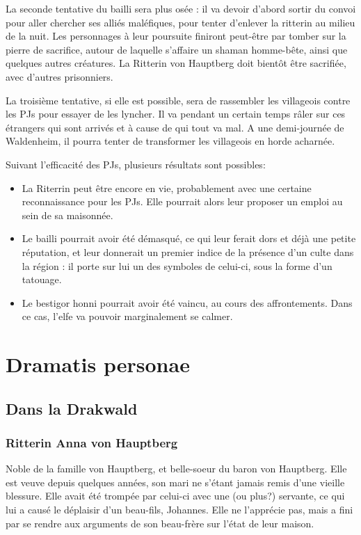 \documentclass[10pt,a4paper]{book}
\begin{document}
La seconde tentative du bailli sera plus osée : il va devoir d'abord sortir du convoi pour aller chercher ses alliés maléfiques, pour tenter d'enlever la ritterin au milieu de la nuit. Les personnages à leur poursuite finiront peut-être par tomber sur la pierre de sacrifice, autour de laquelle s'affaire un shaman homme-bête, ainsi que quelques autres créatures. La Ritterin von Hauptberg doit bientôt être sacrifiée, avec d'autres prisonniers.

La troisième tentative, si elle est possible, sera de rassembler les villageois contre les PJs pour essayer de les lyncher. Il va pendant un certain temps râler sur ces étrangers qui sont arrivés et à cause de qui tout  va mal. A une demi-journée de Waldenheim, il pourra tenter de transformer les villageois en horde acharnée.

Suivant l'efficacité des PJs, plusieurs résultats sont possibles:
\begin{itemize}
\item La Riterrin peut être encore en vie, probablement avec une certaine reconnaissance pour les PJs. Elle pourrait alors leur proposer un emploi au sein de sa maisonnée.
\item Le bailli pourrait avoir été démasqué, ce qui leur ferait dors et déjà une petite réputation, et leur donnerait un premier indice de la présence d'un culte dans la région : il porte sur lui un des symboles de celui-ci, sous la forme d'un tatouage.
\item Le bestigor honni pourrait avoir été vaincu, au cours des affrontements. Dans ce cas, l'elfe va pouvoir marginalement se calmer.
\end{itemize}
\chapter{Dramatis personae}
\section{Dans la Drakwald}
\subsection{Ritterin Anna von Hauptberg} Noble de la famille von Hauptberg, et belle-soeur du baron von Hauptberg. Elle est veuve depuis quelques années, son mari ne s'étant jamais remis d'une vieille blessure. Elle avait été trompée par celui-ci avec une (ou plus?) servante, ce qui lui a causé le déplaisir d'un beau-fils, Johannes. Elle ne l'apprécie pas, mais a fini par se rendre aux arguments de son beau-frère sur l'état de leur maison.
\end{document}
